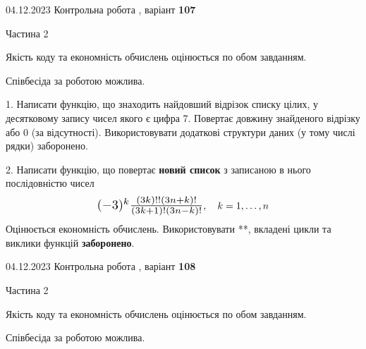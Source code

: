 \documentclass[12pt, ukrainian]{article}
\begin{document}
{{{{{{%



\begin {Huge}
{{04.12.2023 Контрольна робота , варіант  \No \textbf { 107 }\par}}

\begin{center}Частина 2
\end{center}
\vspace{10mm}
\end {Huge}

{
\begin {Large}
Якість коду та економність обчислень оцінюється по обом завданням.

Співбесіда за роботою можлива.

\vspace{5mm}

1. Написати функцію, що знаходить найдовший відрізок списку цілих, у десятковому запису чисел якого є цифра 7. Повертає довжину знайденого відрізку або $0$ (за відсутності). Використовувати додаткові структури даних (у тому числі рядки) заборонено.

\vspace{10mm}



2. 
Написати функцію, що повертає \textbf{новий список} з записаною в нього послідовністю чисел
$$\scalebox{1.3}{$(-3)^{k}\frac{(3k)!!(3n+k)!}{(3k+1)!(3n-k)!}$}, \quad k=1,\ldots,n$$
Оцінюється економність обчислень. Використовувати **, вкладені цикли та виклики функцій \textbf{заборонено}.

\end{Large}\newpage




\begin {Huge}
{{04.12.2023 Контрольна робота , варіант  \No \textbf { 108 }\par}}

\begin{center}Частина 2
\end{center}
\vspace{10mm}
\end {Huge}

{
\begin {Large}
Якість коду та економність обчислень оцінюється по обом завданням.

Співбесіда за роботою можлива.


\end{Large}}}}}}}}}
\end{document}
